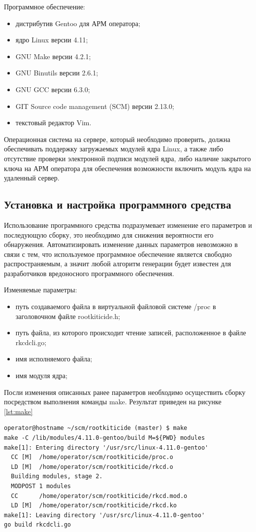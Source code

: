 \documentclass{gost7.32-2001}
\begin{document}
\newpage
Программное обеспечение:
\begin{itemize}
\item
  дистрибутив Gentoo для АРМ оператора;
\item
  ядро Linux версии 4.11;
\item
  GNU Make версии 4.2.1;
\item
  GNU Binutils версии 2.6.1;
\item
  GNU GCC версии 6.3.0;
\item
  GIT Source code management (SCM) версии 2.13.0;
\item
  текстовый редактор Vim.
\end{itemize}

Операционная система на сервере, который необходимо проверить, должна
обеспечивать поддержку загружаемых модулей ядра Linux, а также либо
отсутствие проверки электронной подписи модулей ядра, либо наличие
закрытого ключа на АРМ оператора для обеспечения возможности включить
модуль ядра на удаленный сервер.

\subsection{Установка и настройка программного средства}

Использование программного средства подразумевает изменение его
параметров и последующую сборку, это необходимо для снижения
вероятности его обнаружения. Автоматизировать изменение данных
параметров невозможно в связи с тем, что используемое программное
обеспечение является свободно распространяемым, а значит любой
алгоритм генерации будет известен для разработчиков вредоносного
программного обеспечения.

Изменяемые параметры:
\begin{itemize}
\item
  путь создаваемого файла в виртуальной файловой системе /proc
  в заголовочном файле rootkiticide.h;
\item
  путь файла, из которого происходит чтение записей,
  расположенное в файле rkcdcli.go;
\item
  имя исполняемого файла;
\item
  имя модуля ядра;
\end{itemize}

Посли изменения описанных ранее параметров необходимо осуществить
сборку посредством выполнения команды make. Результат приведен на
рисунке \ref{lst:make}

\begin{lstlisting}[caption={Результат работы make},
    captionpos=b, float, label={lst:make}]
operator@hostname ~/scm/rootkiticide (master) $ make
make -C /lib/modules/4.11.0-gentoo/build M=${PWD} modules
make[1]: Entering directory '/usr/src/linux-4.11.0-gentoo'
  CC [M]  /home/operator/scm/rootkiticide/proc.o
  LD [M]  /home/operator/scm/rootkiticide/rkcd.o
  Building modules, stage 2.
  MODPOST 1 modules
  CC      /home/operator/scm/rootkiticide/rkcd.mod.o
  LD [M]  /home/operator/scm/rootkiticide/rkcd.ko
make[1]: Leaving directory '/usr/src/linux-4.11.0-gentoo'
go build rkcdcli.go
\end{lstlisting}
\end{document}
